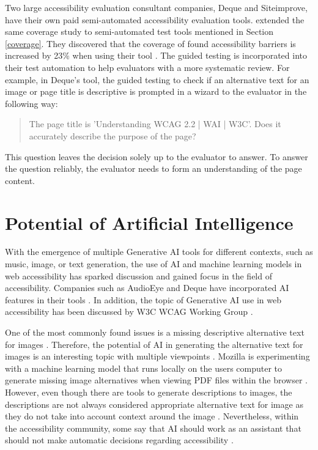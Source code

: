 Two large accessibility evaluation consultant companies, Deque and Siteimprove, have their own paid semi-automated accessibility evaluation tools. \textcite{dequecoverage_semi} extended the same coverage study to semi-automated test tools mentioned in Section \ref{coverage}. They discovered that the coverage of found accessibility barriers is increased by 23\% when using their tool \citep{dequecoverage_semi}. The guided testing is incorporated into their test automation to help evaluators with a more systematic review. For example, in Deque's tool, the guided testing to check if an alternative text for an image or page title is descriptive is prompted in a wizard to the evaluator in the following way: \blockquote{The page title is 'Understanding WCAG 2.2 | WAI | W3C'. Does it accurately describe the purpose of the page?}. This question leaves the decision solely up to the evaluator to answer. To answer the question reliably, the evaluator needs to form an understanding of the page content.


\section{Potential of Artificial Intelligence}

With the emergence of multiple Generative AI tools for different contexts, such as music, image, or text generation, the use of AI and machine learning models in web accessibility has sparked discussion and gained focus in the field of accessibility. Companies such as AudioEye and Deque have incorporated AI features in their tools \citep{deque_igt, boia_improve_accessibility}. In addition, the topic of Generative AI use in web accessibility has been discussed by W3C WCAG Working Group \citep{ai_wcag_email}. 

One of the most commonly found issues is a missing descriptive alternative text for images \citep{webaimmillions, dequecoverage}. Therefore, the potential of AI in generating the alternative text for images is an interesting topic with multiple viewpoints \citep{ai_wcag_email, boia_alt_text, potential_for_ai}. Mozilla is experimenting with a machine learning model that runs locally on the users computer to generate missing image alternatives when viewing PDF files within the browser \citep{alt_image_mozilla}. However, even though there are tools to generate descriptions to images, the descriptions are not always considered appropriate alternative text for image as they do not take into account context around the image \citep{accessibility_and_ai, boia_alt_text}. Nevertheless, within the accessibility community, some say that AI should work as an assistant that should not make automatic decisions regarding accessibility \citep{ai_wcag_email, accessibility_and_ai}.

